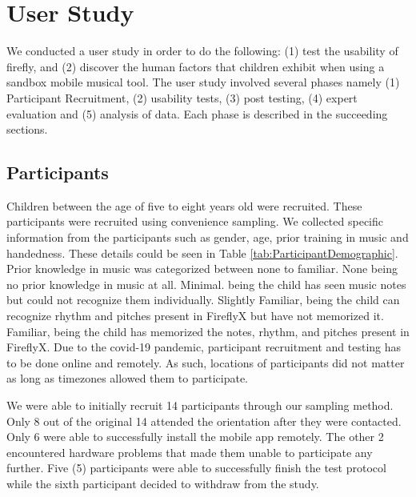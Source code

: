 \chapter{User Study}

We conducted a user study in order to do the following: (1) test the usability of firefly, and (2) discover the human factors that children exhibit when using a sandbox mobile musical tool. The user study involved several phases namely (1) Participant Recruitment, (2) usability tests, (3) post testing, (4) expert evaluation and (5) analysis of data. Each phase is described in the succeeding sections. 

\section{Participants}
Children between the age of five to eight years old were recruited. These participants were recruited using  convenience sampling. We collected specific information from the participants such as gender, age, prior training in music and handedness. These details could be seen in Table \ref{tab:ParticipantDemographic}. Prior knowledge in music was categorized between none to familiar. None being no prior knowledge in music at all. Minimal. being the child has seen music notes but could not recognize them individually. Slightly Familiar, being the child can recognize rhythm and pitches present in FireflyX but have not memorized it. Familiar, being the child has memorized the notes, rhythm, and pitches present in FireflyX. Due to the covid-19 pandemic, participant recruitment and testing has to be done online and remotely. As such, locations of participants did not matter as long as timezones allowed them to participate. 

We were able to initially recruit 14 participants through our sampling method. Only 8 out of the original 14 attended the orientation after they were contacted.  Only 6 were able to successfully install the mobile app remotely. The other 2 encountered hardware problems that made them unable to participate any further. Five (5) participants were able to successfully finish the test protocol while the sixth participant decided to withdraw from the study. 

